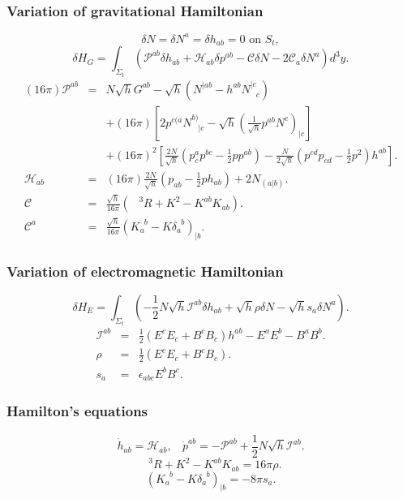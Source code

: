 \subsubsection{Variation of gravitational Hamiltonian}
\[\delta N = \delta N^a = \delta h_{ab} = 0 \mbox{ on } S_t,\]
\[\delta H_G = \int_{\Sigma_t} (\mathcal{P}^{ab} \delta h_{ab} + \mathcal{H}_{ab} \delta p^{ab} - \mathcal{C}\delta N - 2\mathcal{C}_a \delta N^a) d^3 y.\]
\begin{eqnarray}
(16\pi)\mathcal{P}^{ab} &=&  N\sqrt{h}G^{ab} - \sqrt{h}(N^{|ab} - h^{ab} N^{|c}_{\phantom{|c}c}) \nonumber \\
&\phantom{=}& +(16\pi)[2p^{c(a}N^{b)}_{\phantom{b)}|c} - \sqrt{h}(\frac{1}{\sqrt{h}}p^{ab}N^c)_{|c}] \nonumber \\
&\phantom{=}& + (16\pi)^2 [\frac{2N}{\sqrt{h}} (p^a_c p^{bc} - \frac{1}{2} p p^{ab}) - \frac{N}{2\sqrt{h}}(p^{cd}p_{cd} - \frac{1}{2} p^2)h^{ab}]. \nonumber \\
\mathcal{H}_{ab} &=& (16\pi) \frac{2N}{\sqrt{h}} (p_{ab} - \frac{1}{2}p h_{ab}) + 2N_{(a|b)} .\nonumber \\
\mathcal{C} &=& \frac{\sqrt{h}}{16\pi} (\phantom{R}^3R + K^2 - K^{ab}K_{ab}) .\nonumber \\
\mathcal{C}^a &=& \frac{\sqrt{h}}{16\pi} (K_a^{\phantom{a}b} - K \delta_a^{\phantom{a}b})_{|b}. \nonumber 
\end{eqnarray}

\subsubsection{Variation of electromagnetic Hamiltonian}
\[\delta H_E = \int_{\Sigma_t}(-\frac{1}{2}N\sqrt{h}\mathcal{I}^{ab} \delta h_{ab} + \sqrt{h} \rho \delta N - \sqrt{h} s_a \delta N^a).\]
\begin{eqnarray}
\mathcal{I}^{ab} &=& \frac{1}{2}(E^c E_c + B^c B_c)h^{ab} - E^a E^b - B^a B^b. \nonumber \\
\rho &=& \frac{1}{2}(E^c E_c + B^c B_c) .\nonumber \\
s_a &=& \epsilon_{abc} E^b B^c .\nonumber
\end{eqnarray}

\subsubsection{Hamilton's equations}
\[\dot{h}_{ab} = \mathcal{H}_{ab}, \ \ \ \ \dot{p}^{ab} = -\mathcal{P}^{ab}+\frac{1}{2}N\sqrt{h}\mathcal{I}^{ab}.\]
\[\phantom{R}^3R + K^2 - K^{ab}K_{ab} = 16 \pi \rho.\]
\[(K_a^{\phantom{a}b} - K \delta_a^{\phantom{a}b})_{|b} = -8\pi s_a.\]